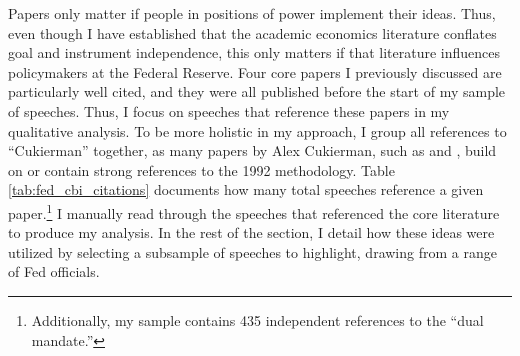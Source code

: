 \documentclass[12pt,a4paper]{article}
\begin{document}
\begin{doublespace}
Papers only matter if people in positions of power implement their ideas. Thus, even though I have established that the academic economics literature conflates goal and instrument independence, this only matters if that literature influences policymakers at the Federal Reserve. Four core papers I previously discussed are particularly well cited, and they were all published before the start of my sample of speeches. Thus, I focus on speeches that reference these papers in my qualitative analysis. To be more holistic in my approach, I group all references to ``Cukierman'' together, as many papers by Alex Cukierman, such as \textcite{cukierman_central_2002} and \textcite{cukierman_central_2008}, build on or contain strong references to the 1992 methodology. Table \ref{tab:fed_cbi_citations} documents how many total speeches reference a given paper.\footnote{Additionally, my sample contains 435 independent references to the ``dual mandate.''} I manually read through the speeches that referenced the core literature to produce my analysis. In the rest of the section, I detail how these ideas were utilized by selecting a subsample of speeches to highlight, drawing from a range of Fed officials. 




\end{doublespace}
\end{document}
